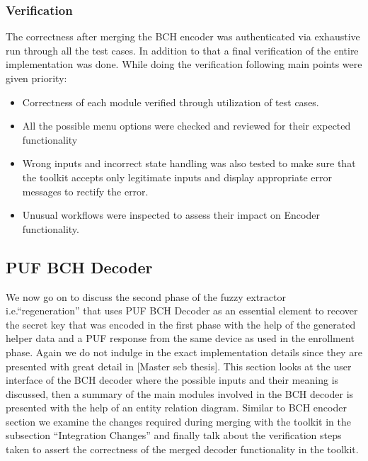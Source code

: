 	\subsubsection{Verification}
	The correctness after merging the BCH encoder was authenticated via exhaustive run through all the test cases. In addition to that a final verification of the entire implementation was done. While doing the verification following main points were given priority:

	\begin{itemize}
		\item Correctness of each module verified through utilization of test cases.
		\item All the possible menu options were checked and reviewed for their expected functionality
		\item Wrong inputs and incorrect state handling was also tested to make sure that the toolkit accepts only legitimate inputs and display appropriate error messages to rectify the error.
		\item Unusual workflows were inspected to assess their impact on Encoder functionality.
	\end{itemize}

	\subsection{PUF BCH Decoder}
	We now go on to discuss the second phase of the fuzzy extractor i.e.``regeneration'' that uses PUF BCH Decoder as an essential element to recover the secret key that was encoded in the first phase with the help of the generated helper data and a PUF response from the same device as used in the enrollment phase. Again we do not indulge in the exact implementation details since they are presented with great detail in [Master seb thesis]. This section looks at the user interface of the BCH decoder where the possible inputs and their meaning is discussed, then a summary of the main modules involved in the BCH decoder
	is presented with the help of an entity relation diagram. Similar to BCH encoder section we examine the changes required during merging with the toolkit in the subsection ``Integration Changes'' and finally talk about the verification steps taken to assert the correctness of the merged decoder functionality in the toolkit.\\

